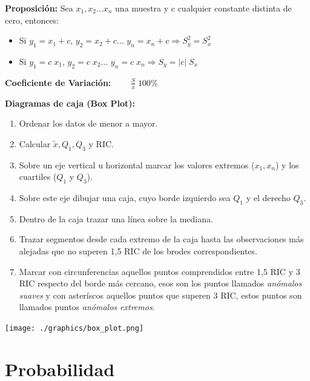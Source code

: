 \documentclass[12pt,a4paper]{report}
\begin{document}
	\vspace{3mm}
	\par \textbf{Proposición:} Sea $x_{1}, x_{2} \dotsc x_{n}$ una muestra y c cualquier constante distinta de cero, entonces:
	\begin{itemize}
		\item Si $y_{1} = x_{1} + c$, $y_{2} = x_{2} + c \dotsc$ $y_{n} = x_{n} + c \Rightarrow S_{y}^{2} = S_{x}^{2}$ 
		\item Si $y_{1} = c \; x_{1}$, $y_{2} = c \; x_{2} \dotsc$ $y_{n} = c \; x_{n} \Rightarrow S_{y} = \lvert c \rvert \; S_{x}$ 
	\end{itemize}
	
	\vspace{3mm}
	\par \textbf{Coeficiente de Variación:} $\qquad \frac{S}{\overline{x}} \; 100\%$
	
	\vspace{3mm}
	\par \textbf{Diagramas de caja (Box Plot):}
	\begin{enumerate}
		\item Ordenar los datos de menor a mayor.
		\item Calcular $\widetilde{x}, Q_{1}, Q_{3}$ y RIC.
		\item Sobre un eje vertical u horizontal marcar los valores extremos ($x_{1}, x_{n}$) y los cuartiles ($Q_{1}$ y $Q_{3}$).
		\item Sobre este eje dibujar una caja, cuyo borde izquierdo sea $Q_{1}$ y el derecho $Q_{3}$.
		\item Dentro de la caja trazar una línea sobre la mediana.
		\item Trazar segmentos desde cada extremo de la caja hasta las observaciones más alejadas que no superen 1,5 RIC de los brodes correspondientes.
		\item Marcar con circunferencias aquellos puntos comprendidos entre 1,5 RIC y 3 RIC respecto del borde más cercano, esos son los puntos llamados \textit{anómalos suaves} y con asteríscos aquellos puntos que superen 3 RIC, estos puntos son llamados puntos \textit{anómalos extremos}.
	\end{enumerate}
	
	\begin{center}
    	\texttt{[image: ./graphics/box\_plot.png]}
	\end{center}
	

\chapter{Probabilidad}
\end{document}
